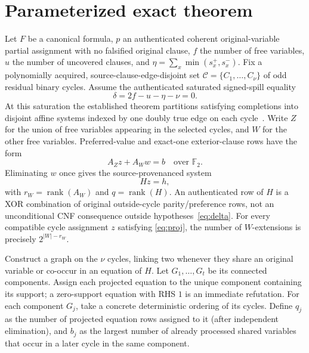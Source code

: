 \documentclass[11pt]{article}
\newcommand{\GF}{\mathbb{F}_2}
\begin{document}
\section{Parameterized exact theorem}
Let $F$ be a canonical formula, $p$ an authenticated coherent original-variable partial assignment with no falsified original clause, $f$ the number of free variables, $u$ the number of uncovered clauses, and $\eta=\sum_x\min(s_x^+,s_x^-)$. Fix a polynomially acquired, source-clause-edge-disjoint set $\mathcal C=\{C_1,\ldots,C_\nu\}$ of odd residual binary cycles. Assume the authenticated saturated signed-spill equality
\begin{equation}\label{eq:delta}
\delta=2f-u-\eta-\nu=0.
\end{equation}
At this saturation the established theorem partitions satisfying completions into disjoint affine systems indexed by one doubly true edge on each cycle~\cite{pnpterminal}. Write $Z$ for the union of free variables appearing in the selected cycles, and $W$ for the other free variables. Preferred-value and exact-one exterior-clause rows have the form
\begin{equation}\label{eq:rows}
A_Zz+A_Ww=b\quad\text{over }\GF.
\end{equation}
Eliminating $w$ once gives the source-provenanced system
\begin{equation}\label{eq:proj}
Hz=h,
\end{equation}
with $r_W=\operatorname{rank}(A_W)$ and $q=\operatorname{rank}(H)$. An authenticated row of $H$ is a XOR combination of original outside-cycle parity/preference rows, not an unconditional CNF consequence outside hypotheses~\eqref{eq:delta}. For every compatible cycle assignment $z$ satisfying \eqref{eq:proj}, the number of $W$-extensions is precisely $2^{|W|-r_W}$.

Construct a graph on the $\nu$ cycles, linking two whenever they share an original variable or co-occur in an equation of $H$. Let $G_1,\ldots,G_t$ be its connected components. Assign each projected equation to the unique component containing its support; a zero-support equation with RHS $1$ is an immediate refutation. For each component $G_j$, take a concrete deterministic ordering of its cycles. Define $q_j$ as the number of projected equation rows assigned to it (after independent elimination), and $b_j$ as the largest number of already processed shared variables that occur in a later cycle in the same component.
\end{document}
